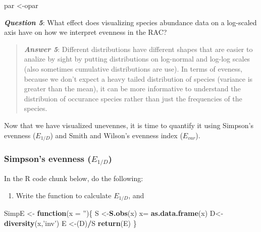\documentclass[
]{article}
\newenvironment{Shaded}{\begin{snugshade}}{\end{snugshade}}
\newcommand{\ControlFlowTok}[1]{\textcolor[rgb]{0.13,0.29,0.53}{\textbf{#1}}}
\newcommand{\DataTypeTok}[1]{\textcolor[rgb]{0.13,0.29,0.53}{#1}}
\newcommand{\KeywordTok}[1]{\textcolor[rgb]{0.13,0.29,0.53}{\textbf{#1}}}
\newcommand{\NormalTok}[1]{#1}
\newcommand{\OperatorTok}[1]{\textcolor[rgb]{0.81,0.36,0.00}{\textbf{#1}}}
\newcommand{\StringTok}[1]{\textcolor[rgb]{0.31,0.60,0.02}{#1}}
\providecommand{\tightlist}{%
  \setlength{\itemsep}{0pt}\setlength{\parskip}{0pt}}
\begin{document}
\begin{Shaded}
\begin{Highlighting}[]
\NormalTok{par <-opar}
\end{Highlighting}
\end{Shaded}

\textbf{\emph{Question 5}}: What effect does visualizing species
abundance data on a log-scaled axis have on how we interpret evenness in
the RAC?

\begin{quote}
\textbf{\emph{Answer 5}}: Different distributions have different shapes
that are easier to analize by sight by putting distributions on
log-normal and log-log scales (also sometimes cumulative distributions
are use). In terms of eveness, because we don't expect a heavy tailed
distribution of species (variance is greater than the mean), it can be
more informative to understand the distribuion of occurance species
rather than just the frequencies of the species.
\end{quote}

Now that we have visualized unevennes, it is time to quantify it using
Simpson's evenness (\(E_{1/D}\)) and Smith and Wilson's evenness index
(\(E_{var}\)).

\hypertarget{simpsons-evenness-e_1d}{%
\subsubsection{\texorpdfstring{Simpson's evenness
(\(E_{1/D}\))}{Simpson's evenness (E\_\{1/D\})}}\label{simpsons-evenness-e_1d}}

In the R code chunk below, do the following:

\begin{enumerate}
\def\labelenumi{\arabic{enumi}.}
\tightlist
\item
  Write the function to calculate \(E_{1/D}\), and
\end{enumerate}

\begin{Shaded}
\begin{Highlighting}[]
\NormalTok{SimpE <-}\StringTok{ }\ControlFlowTok{function}\NormalTok{(}\DataTypeTok{x =} \StringTok{''}\NormalTok{)\{}
\NormalTok{  S <-}\KeywordTok{S.obs}\NormalTok{(x)}
\NormalTok{  x=}\StringTok{ }\KeywordTok{as.data.frame}\NormalTok{(x)}
\NormalTok{  D<-}\StringTok{ }\KeywordTok{diversity}\NormalTok{(x,}\StringTok{'inv'}\NormalTok{)}
\NormalTok{  E <-(D)}\OperatorTok{/}\NormalTok{S}
  \KeywordTok{return}\NormalTok{(E)}
\NormalTok{\}}
\end{Highlighting}
\end{Shaded}
\end{document}
